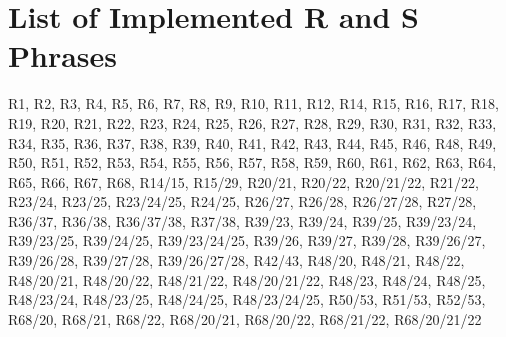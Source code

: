 \documentclass[a4paper,notitlepage,parskip=half]{scrreprt}
\begin{document}
\par\egroup%



\section{List of Implemented R and S Phrases}

\bgroup\footnotesize\noindent
R1,
R2,
R3,
R4,
R5,
R6,
R7,
R8,
R9,
R10,
R11,
R12,
R14,
R15,
R16,
R17,
R18,
R19,
R20,
R21,
R22,
R23,
R24,
R25,
R26,
R27,
R28,
R29,
R30,
R31,
R32,
R33,
R34,
R35,
R36,
R37,
R38,
R39,
R40,
R41,
R42,
R43,
R44,
R45,
R46,
R48,
R49,
R50,
R51,
R52,
R53,
R54,
R55,
R56,
R57,
R58,
R59,
R60,
R61,
R62,
R63,
R64,
R65,
R66,
R67,
R68,
R14/15,
R15/29,
R20/21,
R20/22,
R20/21/22,
R21/22,
R23/24,
R23/25,
R23/24/25,
R24/25,
R26/27,
R26/28,
R26/27/28,
R27/28,
R36/37,
R36/38,
R36/37/38,
R37/38,
R39/23,
R39/24,
R39/25,
R39/23/24,
R39/23/25,
R39/24/25,
R39/23/24/25,
R39/26,
R39/27,
R39/28,
R39/26/27,
R39/26/28,
R39/27/28,
R39/26/27/28,
R42/43,
R48/20,
R48/21,
R48/22,
R48/20/21,
R48/20/22,
R48/21/22,
R48/20/21/22,
R48/23,
R48/24,
R48/25,
R48/23/24,
R48/23/25,
R48/24/25,
R48/23/24/25,
R50/53,
R51/53,
R52/53,
R68/20,
R68/21,
R68/22,
R68/20/21,
R68/20/22,
R68/21/22,
R68/20/21/22
\end{document}
